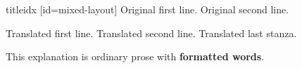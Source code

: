 \begin{ulSongs}{titleidx}
[id={mixed-layout}]
\beginverse*
Original first line.
Original second line.
\endverse
\begin{translation}[EN]
Translated first line.
Translated second line.
\nextverse
Translated last stanza.
\end{translation}
\begin{explanation}[EN]
This explanation is ordinary prose with \textbf{formatted words}.
\end{explanation}
\endsong
\end{ulSongs}
